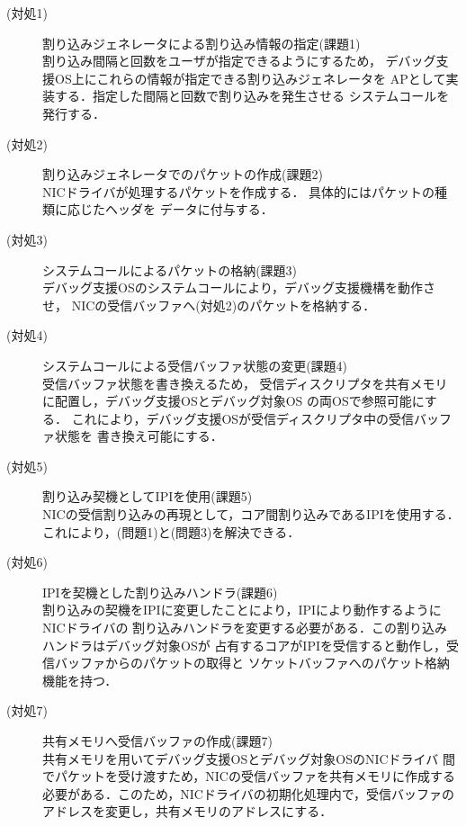 \documentclass[submit,techreq,noauthor,dvipdfmx]{ipsj}
\begin{document}
\begin{description}
    \item[(対処1)] 割り込みジェネレータによる割り込み情報の指定(課題1)\\
        割り込み間隔と回数をユーザが指定できるようにするため，
        デバッグ支援OS上にこれらの情報が指定できる割り込みジェネレータを
        APとして実装する．指定した間隔と回数で割り込みを発生させる
        システムコールを発行する．
    \item[(対処2)] 割り込みジェネレータでのパケットの作成(課題2)\\
        NICドライバが処理するパケットを作成する．
        具体的にはパケットの種類に応じたヘッダを
        データに付与する．
    \item[(対処3)] システムコールによるパケットの格納(課題3)\\
        デバッグ支援OSのシステムコールにより，デバッグ支援機構を動作させ，
        NICの受信バッファへ(対処2)のパケットを格納する．
    \item[(対処4)] システムコールによる受信バッファ状態の変更(課題4)\\
        受信バッファ状態を書き換えるため，
        受信ディスクリプタを共有メモリに配置し，デバッグ支援OSとデバッグ対象OS
        の両OSで参照可能にする．
        これにより，デバッグ支援OSが受信ディスクリプタ中の受信バッファ状態を
        書き換え可能にする．
    \item[(対処5)] 割り込み契機としてIPIを使用(課題5)\\
        NICの受信割り込みの再現として，コア間割り込みであるIPIを使用する．
        これにより，(問題1)と(問題3)を解決できる．
    \item[(対処6)] IPIを契機とした割り込みハンドラ(課題6)\\
        割り込みの契機をIPIに変更したことにより，IPIにより動作するようにNICドライバの
        割り込みハンドラを変更する必要がある．この割り込みハンドラはデバッグ対象OSが
        占有するコアがIPIを受信すると動作し，受信バッファからのパケットの取得と
        ソケットバッファへのパケット格納機能を持つ．
    \item[(対処7)] 共有メモリへ受信バッファの作成(課題7)\\
        共有メモリを用いてデバッグ支援OSとデバッグ対象OSのNICドライバ
        間でパケットを受け渡すため，NICの受信バッファを共有メモリに作成する
        必要がある．このため，NICドライバの初期化処理内で，受信バッファの
        アドレスを変更し，共有メモリのアドレスにする．
\end{description}
\end{document}
